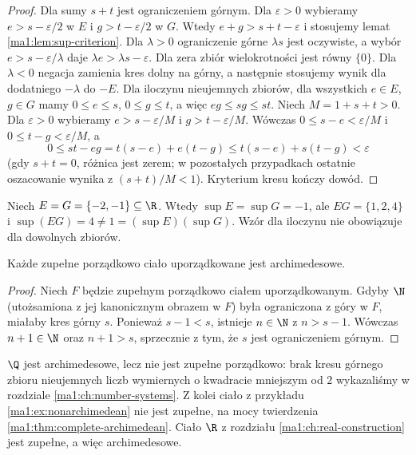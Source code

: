 \begin{proof}
Dla sumy $s+t$ jest ograniczeniem górnym. Dla $\varepsilon>0$ wybieramy $e>s-\varepsilon/2$ w $E$ i $g>t-\varepsilon/2$ w $G$. Wtedy $e+g>s+t-\varepsilon$ i stosujemy lemat \ref{ma1:lem:sup-criterion}. Dla $\lambda>0$ ograniczenie górne $\lambda s$ jest oczywiste, a wybór $e>s-\varepsilon/\lambda$ daje $\lambda e>\lambda s-\varepsilon$. Dla zera zbiór wielokrotności jest równy $\{0\}$. Dla $\lambda<0$ negacja zamienia kres dolny na górny, a następnie stosujemy wynik dla dodatniego $-\lambda$ do $-E$.
Dla iloczynu nieujemnych zbiorów, dla wszystkich $e\in E$, $g\in G$ mamy $0\le e\le s$, $0\le g\le t$, a więc $eg\le sg\le st$. Niech $M=1+s+t>0$. Dla $\varepsilon>0$ wybieramy $e>s-\varepsilon/M$ i $g>t-\varepsilon/M$. Wówczas $0\le s-e<\varepsilon/M$ i $0\le t-g<\varepsilon/M$, a
\[
 0\le st-eg=t(s-e)+e(t-g)
 \le t(s-e)+s(t-g)<\varepsilon
\]
(gdy $s+t=0$, różnica jest zerem; w pozostałych przypadkach ostatnie oszacowanie wynika z $(s+t)/M<1$). Kryterium kresu kończy dowód.
\end{proof}
\begin{przyklad}
Niech $E=G=\{-2,-1\}\subseteq\R$. Wtedy $\sup E=\sup G=-1$, ale $EG=\{1,2,4\}$ i $\sup(EG)=4\ne1=(\sup E)(\sup G)$. Wzór dla iloczynu nie obowiązuje dla dowolnych zbiorów.
\end{przyklad}
\begin{twierdzenie}
\label{ma1:thm:complete-archimedean}
Każde zupełne porządkowo ciało uporządkowane jest archimedesowe.
\end{twierdzenie}
\begin{proof}
Niech $F$ będzie zupełnym porządkowo ciałem uporządkowanym. Gdyby $\N$ (utożsamiona z jej kanonicznym obrazem w $F$) była ograniczona z góry w $F$, miałaby kres górny $s$. Ponieważ $s-1<s$, istnieje $n\in\N$ z $n>s-1$. Wówczas $n+1\in\N$ oraz $n+1>s$, sprzecznie z tym, że $s$ jest ograniczeniem górnym.
\end{proof}
\begin{przyklad}
$\Q$ jest archimedesowe, lecz nie jest zupełne porządkowo: brak kresu górnego zbioru nieujemnych liczb wymiernych o kwadracie mniejszym od $2$ wykazaliśmy w rozdziale \ref{ma1:ch:number-systems}. Z kolei ciało z przykładu \ref{ma1:ex:nonarchimedean} nie jest zupełne, na mocy twierdzenia \ref{ma1:thm:complete-archimedean}. Ciało $\R$ z rozdziału \ref{ma1:ch:real-construction} jest zupełne, a więc archimedesowe.
\end{przyklad}

